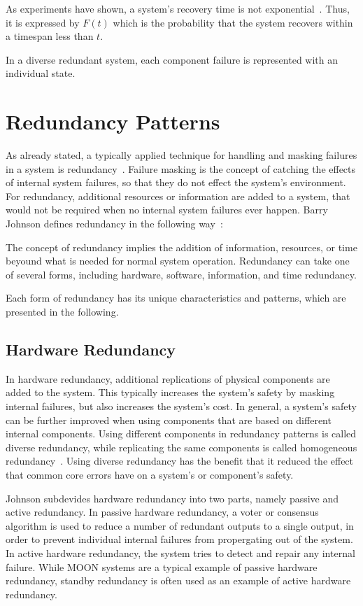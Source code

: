 As experiments have shown, a system's recovery time is not exponential~\cite{TheoryAndPracticeReliableSystem}.
Thus, it is expressed by $F(t)$ which is the probability that the system recovers within a timespan less than $t$.

In a diverse redundant system, each component failure is represented with an individual state.

\section{Redundancy Patterns}
As already stated, a typically applied technique for handling and masking failures in a system is redundancy~\cite{TanenbaumSteen07}.
Failure masking is the concept of catching the effects of internal system failures, so that they do not effect the system's environment.
For redundancy, additional resources or information are added to a system, that would not be required when no internal system failures ever happen.
Barry Johnson defines redundancy in the following way~\cite{BarryFaultToleranceAnalysis}:
\begin{definition}
The concept of redundancy implies the addition of information, resources, or time beyound what is needed for normal system operation.
Redundancy can take one of several forms, including hardware, software, information, and time redundancy.
\end{definition}

Each form of redundancy has its unique characteristics and patterns, which are presented in the following.

\subsection{Hardware Redundancy}
In hardware redundancy, additional replications of physical components are added to the system.
This typically increases the system's safety by masking internal failures, but also increases the system's cost.
In general, a system's safety can be further improved when using components that are based on different internal components.
Using different components in redundancy patterns is called diverse redundancy, while replicating the same components is called homogeneous redundancy~\cite{HomogeneousRedundancyOuzineb}.
Using diverse redundancy has the benefit that it reduced the effect that common core errors have on a system's or component's safety.

Johnson subdevides hardware redundancy into two parts, namely passive and active redundancy.
In passive hardware redundancy, a voter or consensus algorithm is used to reduce a number of redundant outputs to a single output, in order to prevent individual internal failures from propergating out of the system.
In active hardware redundancy, the system tries to detect and repair any internal failure.
While \gls*{MOON} systems are a typical example of passive hardware redundancy, standby redundancy is often used as an example of active hardware redundancy.

